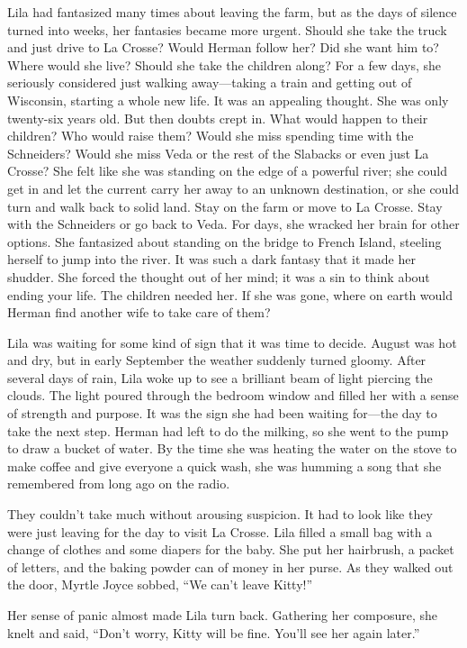 \documentclass[
  american,
  letterpaper,
]{book}
\begin{document}
Lila had fantasized many times about leaving the farm, but as the days
of silence turned into weeks, her fantasies became more urgent. Should
she take the truck and just drive to La Crosse? Would Herman follow her?
Did she want him to? Where would she live? Should she take the children
along? For a few days, she seriously considered just walking
away---taking a train and getting out of Wisconsin, starting a whole new
life. It was an appealing thought. She was only twenty-six years old.
But then doubts crept in. What would happen to their children? Who would
raise them? Would she miss spending time with the Schneiders? Would she
miss Veda or the rest of the Slabacks or even just La Crosse? She felt
like she was standing on the edge of a powerful river; she could get in
and let the current carry her away to an unknown destination, or she
could turn and walk back to solid land. Stay on the farm or move to La
Crosse. Stay with the Schneiders or go back to Veda. For days, she
wracked her brain for other options. She fantasized about standing on
the bridge to French Island, steeling herself to jump into the river. It
was such a dark fantasy that it made her shudder. She forced the thought
out of her mind; it was a sin to think about ending your life. The
children needed her. If she was gone, where on earth would Herman find
another wife to take care of them?

Lila was waiting for some kind of sign that it was time to decide.
August was hot and dry, but in early September the weather suddenly
turned gloomy. After several days of rain, Lila woke up to see a
brilliant beam of light piercing the clouds. The light poured through
the bedroom window and filled her with a sense of strength and purpose.
It was the sign she had been waiting for---the day to take the next
step. Herman had left to do the milking, so she went to the pump to draw
a bucket of water. By the time she was heating the water on the stove to
make coffee and give everyone a quick wash, she was humming a song that
she remembered from long ago on the radio.

They couldn't take much without arousing suspicion. It had to look like
they were just leaving for the day to visit La Crosse. Lila filled a
small bag with a change of clothes and some diapers for the baby. She
put her hairbrush, a packet of letters, and the baking powder can of
money in her purse. As they walked out the door, Myrtle Joyce sobbed,
``We can't leave Kitty!''

Her sense of panic almost made Lila turn back. Gathering her composure,
she knelt and said, ``Don't worry, Kitty will be fine. You'll see her
again later.''
\end{document}
